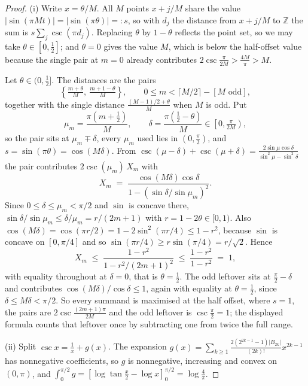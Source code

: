 \documentclass[11pt]{amsart}
\theoremstyle{definition}
\theoremstyle{remark}
\begin{document}
\begin{proof}
(i) Write $x = \theta/M$. All $M$ points $x + j/M$ share the value $|\sin(\pi M t)| = |\sin(\pi\theta)| =: s$, so with $d_{j}$ the distance from $x + j/M$ to $\mathbb{Z}$ the sum is $s\sum_{j}\csc(\pi d_{j})$. Replacing $\theta$ by $1-\theta$ reflects the point set, so we may take $\theta \in [0,\tfrac12]$; and $\theta = 0$ gives the value $M$, which is below the half-offset value because the single pair at $m = 0$ already contributes $2\csc\frac{\pi}{2M} > \frac{4M}{\pi} > M$.

Let $\theta \in (0,\tfrac12]$. The distances are the pairs
\[
  \left\{\tfrac{m+\theta}{M},\ \tfrac{m+1-\theta}{M}\right\}, \qquad 0 \le m < \lceil M/2\rceil - [M \text{ odd}],
\]
together with the single distance $\frac{(M-1)/2+\theta}{M}$ when $M$ is odd. Put
\[
  \mu_{m} = \frac{\pi(m+\tfrac12)}{M}, \qquad \delta = \frac{\pi(\tfrac12-\theta)}{M} \in \left[0, \tfrac{\pi}{2M}\right),
\]
so the pair sits at $\mu_{m} \mp \delta$, every $\mu_{m}$ used lies in $(0, \tfrac{\pi}{2})$, and $s = \sin(\pi\theta) = \cos(M\delta)$. From $\csc(\mu-\delta)+\csc(\mu+\delta) = \frac{2\sin\mu\cos\delta}{\sin^{2}\mu - \sin^{2}\delta}$ the pair contributes $2\csc(\mu_{m})\,X_{m}$ with
\[
  X_{m} \;=\; \frac{\cos(M\delta)\cos\delta}{1 - \left(\sin\delta/\sin\mu_{m}\right)^{2}} .
\]
Since $0 \le \delta \le \mu_{m} < \pi/2$ and $\sin$ is concave there, $\sin\delta/\sin\mu_{m} \le \delta/\mu_{m} = r/(2m+1)$ with $r = 1-2\theta \in [0,1)$. Also $\cos(M\delta) = \cos(\pi r/2) = 1 - 2\sin^{2}(\pi r/4) \le 1 - r^{2}$, because $\sin$ is concave on $[0,\pi/4]$ and so $\sin(\pi r/4) \ge r\sin(\pi/4) = r/\sqrt{2}$. Hence
\[
  X_{m} \;\le\; \frac{1-r^{2}}{1 - r^{2}/(2m+1)^{2}} \;\le\; \frac{1-r^{2}}{1-r^{2}} \;=\; 1,
\]
with equality throughout at $\delta = 0$, that is $\theta = \tfrac12$. The odd leftover sits at $\frac{\pi}{2}-\delta$ and contributes $\cos(M\delta)/\cos\delta \le 1$, again with equality at $\theta = \tfrac12$, since $\delta \le M\delta < \pi/2$. So every summand is maximised at the half offset, where $s = 1$, the pairs are $2\csc\frac{(2m+1)\pi}{2M}$ and the odd leftover is $\csc\frac{\pi}{2} = 1$; the displayed formula counts that leftover once by subtracting one from twice the full range.

(ii) Split $\csc x = \frac{1}{x} + g(x)$. The expansion $g(x) = \sum_{k\ge1}\frac{2(2^{2k-1}-1)|B_{2k}|}{(2k)!}x^{2k-1}$ has nonnegative coefficients, so $g$ is nonnegative, increasing and convex on $(0,\pi)$, and $\int_{0}^{\pi/2} g = \left[\log\tan\frac{x}{2} - \log x\right]_{0}^{\pi/2} = \log\frac{4}{\pi}$.


\end{proof}
\end{document}
